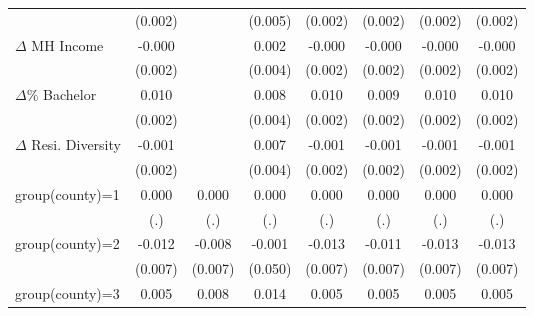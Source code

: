 {\begin{tabular}{l*{7}{c}}
                    &     (0.002)         &                     &     (0.005)         &     (0.002)         &     (0.002)         &     (0.002)         &     (0.002)         \\
$\Delta$ MH Income  &      -0.000         &                     &       0.002         &      -0.000         &      -0.000         &      -0.000         &      -0.000         \\
                    &     (0.002)         &                     &     (0.004)         &     (0.002)         &     (0.002)         &     (0.002)         &     (0.002)         \\
$\Delta \%$ Bachelor&       0.010\sym{***}&                     &       0.008\sym{*}  &       0.010\sym{***}&       0.009\sym{***}&       0.010\sym{***}&       0.010\sym{***}\\
                    &     (0.002)         &                     &     (0.004)         &     (0.002)         &     (0.002)         &     (0.002)         &     (0.002)         \\
$\Delta$ Resi. Diversity&      -0.001         &                     &       0.007\sym{*}  &      -0.001         &      -0.001         &      -0.001         &      -0.001         \\
                    &     (0.002)         &                     &     (0.004)         &     (0.002)         &     (0.002)         &     (0.002)         &     (0.002)         \\
group(county)=1     &       0.000         &       0.000         &       0.000         &       0.000         &       0.000         &       0.000         &       0.000         \\
                    &         (.)         &         (.)         &         (.)         &         (.)         &         (.)         &         (.)         &         (.)         \\
group(county)=2     &      -0.012\sym{*}  &      -0.008         &      -0.001         &      -0.013\sym{*}  &      -0.011         &      -0.013\sym{*}  &      -0.013\sym{*}  \\
                    &     (0.007)         &     (0.007)         &     (0.050)         &     (0.007)         &     (0.007)         &     (0.007)         &     (0.007)         \\
group(county)=3     &       0.005         &       0.008         &       0.014         &       0.005         &       0.005         &       0.005         &       0.005         \\

\end{tabular}}
